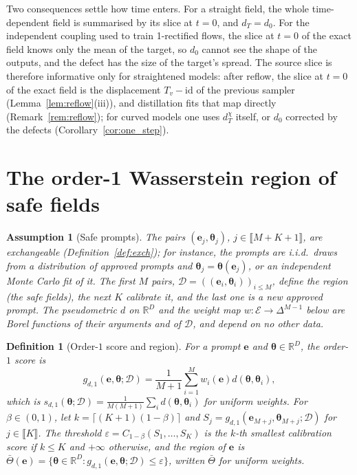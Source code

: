 \documentclass{article}
\newcommand{\RR}{\mathbb{R}}
\newcommand{\cD}{\mathcal{D}}
\newcommand{\cE}{\mathcal{E}}
\newcommand{\bth}{\boldsymbol{\theta}}
\newcommand{\be}{\mathbf{e}}
\newcommand{\Tbar}{\bar{\Theta}}
\theoremstyle{plain}
\newtheorem{definition}[theorem]{Definition}
\newtheorem{assumption}[theorem]{Assumption}
\theoremstyle{remark}
\begin{document}
Two consequences settle how time enters. For a straight field, the whole time-dependent field is
summarised by its slice at $t=0$, and $d_T=d_0$. For the independent coupling used to train
1-rectified flows, the slice at $t=0$ of the exact field knows only the mean of the target, so
$d_0$ cannot see the shape of the outputs, and the defect has the size of the target's spread.
The source slice is therefore informative only for straightened models: after reflow, the slice at $t=0$ of the exact
field is the displacement $T_v-\mathrm{id}$ of the previous sampler (Lemma~\ref{lem:reflow}(iii)), and distillation fits that map directly
(Remark~\ref{rem:reflow}); for curved models one uses $d^\chi_T$ itself, or
$d_0$ corrected by the defects (Corollary~\ref{cor:one_step}).

\section{The order-1 Wasserstein region of safe fields}\label{sec:region}

\begin{assumption}[Safe prompts]\label{as:exch}
The pairs $(\be_j,\bth_j)$, $j\in\llbracket M+K+1\rrbracket$, are exchangeable (Definition~\ref{def:exch}); for instance, the prompts are
i.i.d.\ draws from a distribution of approved prompts and $\bth_j=\bth(\be_j)$, or an independent
Monte Carlo fit of it. The first $M$ pairs, $\cD=((\be_i,\bth_i))_{i\le M}$, define the region (the
\emph{safe fields}), the next $K$ calibrate it, and the last one is a new approved prompt. The
pseudometric $d$ on $\RR^D$ and the weight map $w:\cE\to\Delta^{M-1}$ below are Borel functions of their arguments and of $\cD$,
and depend on no other data.
\end{assumption}

\begin{definition}[Order-$1$ score and region]\label{def:region}
For a prompt $\be$ and $\bth\in\RR^D$, the order-$1$ score is
\[
g_{d,1}(\be,\bth;\cD)=\frac{1}{M+1}\sum_{i=1}^Mw_i(\be)d(\bth,\bth_i),
\]
which is $s_{d,1}(\bth;\cD)=\frac{1}{M(M+1)}\sum_id(\bth,\bth_i)$ for uniform weights. For $\beta\in(0,1)$, let
$k=\lceil(K+1)(1-\beta)\rceil$ and $S_j=g_{d,1}(\be_{M+j},\bth_{M+j};\cD)$ for $j\in\llbracket K\rrbracket$. The
threshold $\varepsilon=C_{1-\beta}(S_1,\dots,S_K)$ is the $k$-th smallest calibration score if $k\le K$ and
$+\infty$ otherwise, and the region of $\be$ is $\Tbar(\be)=\{\bth\in\RR^D:g_{d,1}(\be,\bth;\cD)\le\varepsilon\}$,
written $\Tbar$ for uniform weights.
\end{definition}
\end{document}
